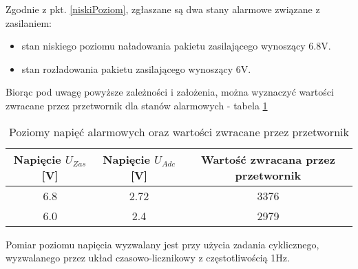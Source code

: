 Zgodnie z pkt. \ref{niskiPoziom}, zgłaszane są dwa stany alarmowe związane z zasilaniem:
\begin{itemize}
\item
    stan niskiego poziomu naładowania pakietu zasilającego wynoszący 6.8V.
\item
    stan rozładowania pakietu zasilającego wynoszący 6V.
\end{itemize}

Biorąc pod uwagę powyższe zależności i założenia, można wyznaczyć wartości zwracane przez przetwornik dla stanów alarmowych - tabela \ref{tab:napieciaDwojnik}

\begin{table}[h]
    \caption{Poziomy napięć alarmowych oraz wartości zwracane przez przetwornik}
    \begin{center}
		\label{tab:napieciaDwojnik}
		\begin{tabular}{|c|c|c|}
			\hline
 			\textbf{Napięcie $U_{Zas}$ [V]}& \textbf{Napięcie $U_{Adc}$ [V]}& \textbf{Wartość zwracana przez przetwornik} \\
 			\hline
 			6.8 & 2.72 & 3376 \\  
 			\hline
			6.0 & 2.4 & 2979 \\
			\hline
		\end{tabular}
	\end{center}
\end{table}

Pomiar poziomu napięcia wyzwalany jest przy użycia zadania cyklicznego, wyzwalanego przez układ czasowo-licznikowy z częstotliwością 1Hz.




